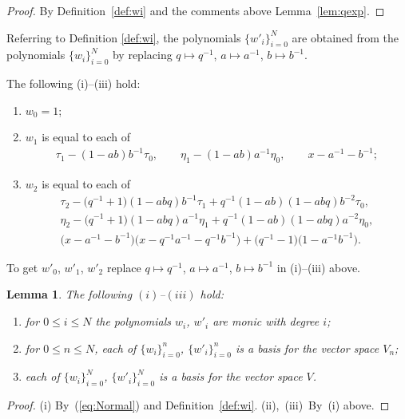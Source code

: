 \documentclass[pdftex]{sigma}
\numberwithin{equation}{section}
\newtheorem{Lemma}[Theorem]{Lemma}
\begin{document}
\begin{proof} By Definition~\ref{def:wi} and the comments above Lemma~\ref{lem:qexp}.
\end{proof}

\begin{Note}\label{note:wprime}
Referring to Definition \ref{def:wi}, the polynomials
$\lbrace w'_i\rbrace_{i=0}^N$ are obtained
from the polynomials $\lbrace w_i\rbrace_{i=0}^N$ by replacing
$q \mapsto q^{-1}$,
$a\mapsto a^{-1}$,
$b\mapsto b^{-1}$.
\end{Note}


\begin{Example}
\label{eq:wsmallex}
The following {\rm (i)--(iii)} hold:
\begin{enumerate}\itemsep=0pt
\item[(i)]
$w_0 =1$;
\item[(ii)]
$w_1$ is equal to each of
\begin{gather*}
\tau_1-(1-ab)b^{-1} \tau_0,
\qquad
\eta_1-(1-ab)a^{-1} \eta_0,
\qquad
x - a^{-1} - b^{-1};
\end{gather*}
\item[(iii)] $w_2$ is equal to each of
\begin{gather*}
 \tau_2 -\big(q^{-1}+1\big) (1-abq)b^{-1} \tau_1
+ q^{-1}(1-ab)(1-abq) b^{-2} \tau_0,
\\
 \eta_2 -\big(q^{-1}+1\big) (1-abq)a^{-1} \eta_1
+ q^{-1}(1-ab)(1-abq) a^{-2} \eta_0,
\\
 \big(x-a^{-1}-b^{-1}\big)\big(x-q^{-1}a^{-1}-q^{-1}b^{-1}\big)+
\big(q^{-1}-1\big)\big(1-a^{-1}b^{-1}\big).
\end{gather*}
\end{enumerate}
To get $w'_0$, $w'_1$, $w'_2$ replace
$q \mapsto q^{-1}$,
$a\mapsto a^{-1}$,
$b\mapsto b^{-1}$ in (i)--(iii) above.
\end{Example}


\begin{Lemma}\label{lem:wibasis}
The following $(i)$--$(iii)$ hold:
\begin{enumerate}\itemsep=0pt
\item[$(i)$]
for $0 \leq i \leq N$
the polynomials $w_i$, $w'_i$ are monic with degree
$i$;
\item[$(ii)$] for $0 \leq n\leq N$, each of
$\lbrace w_i \rbrace_{i=0}^n$,
$\lbrace w'_i \rbrace_{i=0}^n$ is a basis for the vector space $V_n$;
\item[$(iii)$]
each of $\lbrace w_i \rbrace_{i=0}^N$,
 $\lbrace w'_i \rbrace_{i=0}^N$ is a basis for the vector space $V$.
\end{enumerate}
\end{Lemma}
\begin{proof} (i)
By~(\ref{eq:Normal})
and Definition~\ref{def:wi}.
(ii),~(iii)~By~(i) above.
\end{proof}
\end{document}
